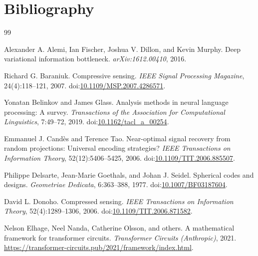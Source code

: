 
\chapter*{Bibliography}

\begin{thebibliography}{99}

Alexander A. Alemi, Ian Fischer, Joshua V. Dillon, and Kevin Murphy.
\newblock Deep variational information bottleneck.
\newblock \emph{arXiv:1612.00410}, 2016.

Richard G. Baraniuk.
\newblock Compressive sensing.
\newblock \emph{IEEE Signal Processing Magazine}, 24(4):118--121, 2007.
\newblock doi:\href{https://doi.org/10.1109/MSP.2007.4286571}{10.1109/MSP.2007.4286571}.

Yonatan Belinkov and James Glass.
\newblock Analysis methods in neural language processing: A survey.
\newblock \emph{Transactions of the Association for Computational Linguistics}, 7:49--72, 2019.
\newblock doi:\href{https://doi.org/10.1162/tacl_a_00254}{10.1162/tacl\_a\_00254}.

Emmanuel J. Cand{\`e}s and Terence Tao.
\newblock Near-optimal signal recovery from random projections: Universal encoding strategies?
\newblock \emph{IEEE Transactions on Information Theory}, 52(12):5406--5425, 2006.
\newblock doi:\href{https://doi.org/10.1109/TIT.2006.885507}{10.1109/TIT.2006.885507}.

Philippe Delsarte, Jean-Marie Goethals, and Johan J. Seidel.
\newblock Spherical codes and designs.
\newblock \emph{Geometriae Dedicata}, 6:363--388, 1977.
\newblock doi:\href{https://doi.org/10.1007/BF03187604}{10.1007/BF03187604}.

David L. Donoho.
\newblock Compressed sensing.
\newblock \emph{IEEE Transactions on Information Theory}, 52(4):1289--1306, 2006.
\newblock doi:\href{https://doi.org/10.1109/TIT.2006.871582}{10.1109/TIT.2006.871582}.

Nelson Elhage, Neel Nanda, Catherine Olsson, and others.
\newblock A mathematical framework for transformer circuits.
\newblock \emph{Transformer Circuits (Anthropic)}, 2021.
\newblock \url{https://transformer-circuits.pub/2021/framework/index.html}.


\end{thebibliography}
